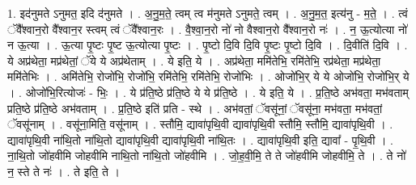\documentclass[17pt]{extarticle}
\begin{document}
1. इद॑नुमते ऽनुमत॒ इदि द॑नुमते । . अ॒नु॒म॒ते॒ त्वम् त्व म॑नुमते ऽनुमते॒ त्वम् । . अ॒नु॒म॒त॒ इत्य॑नु - म॒ते॒ । . त्वं ॅवै᳚श्वान॒रो वै᳚श्वान॒र स्त्वम् त्वं ॅवै᳚श्वान॒रः । . वै॒श्वा॒न॒रो नो॑ नो वैश्वान॒रो वै᳚श्वान॒रो नः॑ । . न॒ ऊ॒त्योत्या नो॑ न ऊ॒त्या । . ऊ॒त्या पृ॒ष्टः पृ॒ष्ट ऊ॒त्योत्या पृ॒ष्टः । . पृ॒ष्टो दि॒वि दि॒वि पृ॒ष्टः पृ॒ष्टो दि॒वि । . दि॒वीति॑ दि॒वि । . ये अप्र॑थेता॒ मप्र॑थेतां॒ ॅये ये अप्र॑थेताम् । . ये इति॒ ये । . अप्र॑थेता॒ ममि॑तेभि॒ रमि॑तेभि॒ रप्र॑थेता॒ मप्र॑थेता॒ ममि॑तेभिः । . अमि॑तेभि॒ रोजो॑भि॒ रोजो॑भि॒ रमि॑तेभि॒ रमि॑तेभि॒ रोजो॑भिः । . ओजो॑भि॒र् ये ये ओजो॑भि॒ रोजो॑भि॒र् ये । . ओजो॑भि॒रित्योजः॑ - भिः॒ । . ये प्र॑ति॒ष्ठे प्र॑ति॒ष्ठे ये ये प्र॑ति॒ष्ठे । . ये इति॒ ये । . प्र॒ति॒ष्ठे अभ॑वता॒ मभ॑वताम् प्रति॒ष्ठे प्र॑ति॒ष्ठे अभ॑वताम् । . प्र॒ति॒ष्ठे इति॑ प्रति - स्थे । . अभ॑वतां॒ ॅवसू॑नां॒ ॅवसू॑ना॒ मभ॑वता॒ मभ॑वतां॒ ॅवसू॑नाम् । . वसू॑ना॒मिति॒ वसू॑नाम् । . स्तौमि॒ द्यावा॑पृथि॒वी द्यावा॑पृथि॒वी स्तौमि॒ स्तौमि॒ द्यावा॑पृथि॒वी । . द्यावा॑पृथि॒वी ना॑थि॒तो ना॑थि॒तो द्यावा॑पृथि॒वी द्यावा॑पृथि॒वी ना॑थि॒तः । . द्यावा॑पृथि॒वी इति॒ द्यावा᳚ - पृ॒थि॒वी । . ना॒थि॒तो जो॑हवीमि जोहवीमि नाथि॒तो ना॑थि॒तो जो॑हवीमि । . जो॒ह॒वी॒मि॒ ते ते जो॑हवीमि जोहवीमि॒ ते । . ते नो॑ न॒ स्ते ते नः॑ । . ते इति॒ ते । \newline
\end{document}
